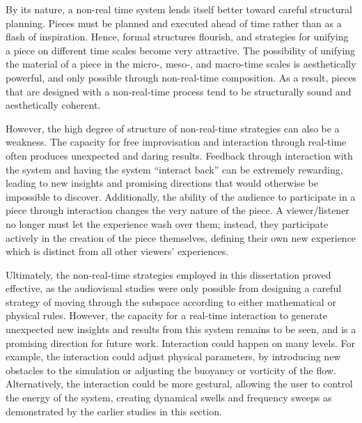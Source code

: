By its nature, a non-real time system lends itself better toward careful structural planning. Pieces must be planned and executed ahead of time rather than as a flash of inspiration. Hence, formal structures flourish, and strategies for unifying a
piece on different time scales become very attractive. The possibility of unifying the material of a piece in the micro-, meso-, and macro-time scales is aesthetically powerful, and only possible through non-real-time composition. As a result, pieces that
are designed with a non-real-time process tend to be structurally sound and aesthetically coherent.

However, the high degree of structure of non-real-time strategies can also be a weakness. The capacity for free improvisation and interaction through real-time often produces unexpected and daring results. Feedback through interaction with the system and having the system ``interact back'' can be extremely rewarding, leading to new insights and promising directions that would otherwise be impossible to discover. Additionally, the ability of the audience to participate in a piece through interaction changes the very nature of the piece. A viewer/listener no longer must let the experience wash over them; instead, they participate actively in the creation of the piece themselves, defining their own new experience which is distinct from all other viewers' experiences.

Ultimately, the non-real-time strategies employed in this dissertation proved effective, as the audiovisual studies were only possible from designing a careful strategy of moving through the subspace according to either mathematical or physical rules. However, the capacity for a real-time interaction to generate unexpected new insights and results from this system remains to be seen, and is a promising direction for future work. Interaction could happen on many levels. For example, the interaction could adjust physical parameters, by introducing new obstacles to the simulation or adjusting the buoyancy or vorticity of the flow. Alternatively, the interaction could be more gestural, allowing the user to control the energy of the system, creating dynamical swells and frequency sweeps as demonstrated by the earlier studies in this section. 

